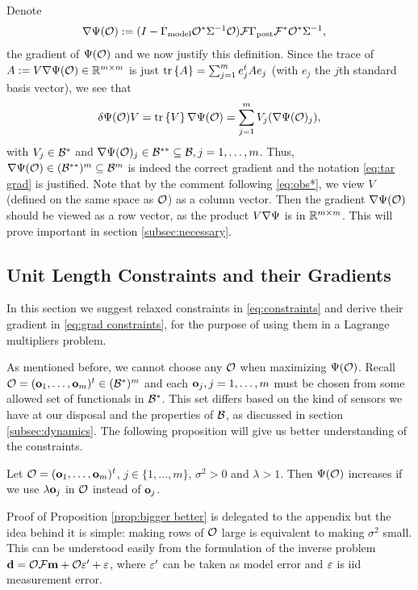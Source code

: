 \documentclass{amsart}
\numberwithin{equation}{section}
\begin{document}
Denote
\begin{align}\label{eq:tar grad}
  \nabla \Psi(\mathcal{O}) &:= (I - \Gamma_{\textup{model}} \mathcal{O}^* \Sigma^{-1} \mathcal{O}) \mathcal{F}
  \Gamma_{\textup{post}} \mathcal{F}^* \mathcal{O}^*\Sigma^{-1},
\end{align}
the gradient of $\Psi (\mathcal{O} )$ and we now justify this definition.
Since the trace of $A := V \nabla \Psi(\mathcal{O}) \in \mathbb{R}^{m \times m}$ is
just $\textup{tr}\left \{A \right \} = \sum_{j=1}^m e_j^t A e_j$ (with $e_j$ the $j$th standard
basis vector), we see that
\begin{align*}
  \delta \Psi(\mathcal{O})V = \textup{tr}\left \{V \right \} \nabla \Psi(\mathcal{O}) = \sum_{j=1}^m
  V_j(\nabla \Psi(\mathcal{O})_j),
\end{align*}
with $V_j \in \mathcal{B}^*$ and $\nabla \Psi(\mathcal{O})_j \in \mathcal{B}^{**}\subseteq
\mathcal{B}, j=1,\dots,m$. Thus, $\nabla \Psi( \mathcal{O} ) \in (\mathcal{B}^{**})^m
\subseteq \mathcal{B}^m$ is indeed the correct gradient and the notation
\eqref{eq:tar grad} is justified. Note that by the comment following
\eqref{eq:obs*}, we view $V$ (defined on the same space as $\mathcal{O}$) as
a column vector. Then the gradient $\nabla \Psi(\mathcal{O})$ should be
viewed as a row vector, as the product $V \nabla \Psi$ is in $\mathbb{R}^{m
  \times m}$. This will prove important in section
\ref{subsec:necessary}.

\subsection{Unit Length Constraints and their Gradients}\label{subsec:unit length}
In this section we suggest relaxed constraints in
\eqref{eq:constraints} and derive their gradient in \eqref{eq:grad
  constraints}, for the purpose of using them in a Lagrange
multipliers problem.

As mentioned before, we cannot choose any $\mathcal{O}$ when maximizing
$\Psi(\mathcal{O})$. Recall $\mathcal{O} = (\mathbf{o}_1,\dots,\mathbf{o}_m)^t \in (\mathcal{B}^*)^m$
and each $\mathbf{o}_j,j=1,\dots,m$ must be chosen from some allowed set of
functionals in $\mathcal{B}^*$. This set differs based on the kind of sensors
we have at our disposal and the properties of $\mathcal{B}$, as discussed in
section \ref{subsec:dynamics}. The following proposition will give us
better understanding of the constraints. 
\begin{proposition}\label{prop:bigger better}
  Let $\mathcal{O} = (\mathbf{o}_1,\dots,\mathbf{o}_m)^t$, $j \in \{1,\dots,m\}$, $\sigma^2
  > 0$ and $\lambda > 1$. Then $\Psi(\mathcal{O})$ increases if we use
  $\lambda \mathbf{o}_j$ in $\mathcal{O}$ instead of $\mathbf{o}_j$.
\end{proposition}
Proof of Proposition \ref{prop:bigger better} is delegated to the
appendix but the idea behind it is simple: making rows of $\mathcal{O}$ large
is equivalent to making $\sigma^2$ small. This can be understood
easily from the formulation of the inverse problem $\mathbf{d} = \mathcal{O} \mathcal{F}
\mathbf{m} + \mathcal{O} \varepsilon' + \varepsilon$, where $\varepsilon'$ can be taken as model error
and $\varepsilon$ is iid measurement error.
\end{document}
